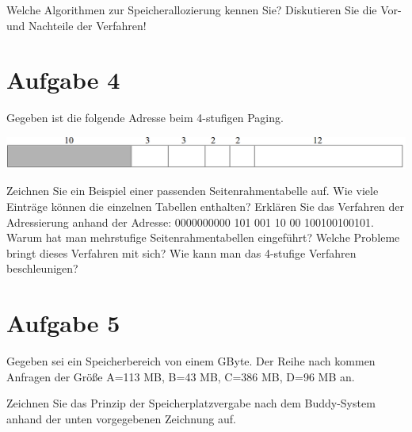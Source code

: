 Welche Algorithmen zur Speicherallozierung kennen Sie? Diskutieren Sie die Vor- und Nachteile der Verfahren!

\section{Aufgabe 4}

Gegeben ist die folgende Adresse beim 4-stufigen Paging.

\includegraphics[width=\textwidth]{assets/uebungsblatt_3_task_4.png}

Zeichnen Sie ein Beispiel einer passenden Seitenrahmentabelle auf. Wie viele Einträge können die einzelnen Tabellen enthalten? Erklären Sie das Verfahren der Adressierung anhand der Adresse: 0000000000 101 001 10 00 100100100101. Warum hat man mehrstufige Seitenrahmentabellen eingeführt? Welche Probleme bringt dieses Verfahren mit sich? Wie kann man das 4-stufige Verfahren beschleunigen?

\section{Aufgabe 5}

Gegeben sei ein Speicherbereich von einem GByte. Der Reihe nach kommen Anfragen der Größe A=113 MB, B=43 MB, C=386 MB, D=96 MB an.

Zeichnen Sie das Prinzip der Speicherplatzvergabe nach dem Buddy-System anhand der unten vorgegebenen Zeichnung auf.


